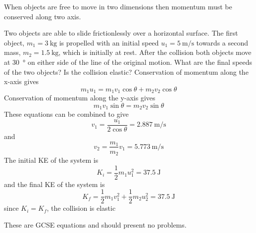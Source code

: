 \documentclass[main.tex]{subfiles}
\begin{document}

When objects are free to move in two dimensions then momentum must be conserved along two axis.

\begin{example}
	Two objects are able to slide frictionlessly over a horizontal surface. The first object, $m_1=\SI{3}{\kg}$ is propelled with an initial speed $u_1=\SI{5}{\m\per\s}$ towards a second mass, $m_2=\SI{1.5}{\kg}$, which is initially at rest. After the collision both objects move at \SI{30}{\degree} on either side of the line of the original motion. What are the final speeds of the two objects? Is the collision elastic?
	\answer
	Conservation of momentum along the x-axis gives
	$$ m_1u_1 = m_1v_1\cos{\theta} + m_2v_2\cos{\theta}$$
	Conservation of momentum along the y-axis gives
	$$ m_1v_1\sin{\theta} = m_2v_2\sin{\theta} $$
	These equations can be combined to give
	$$ v_1 = \frac{u_1}{2\cos{\theta}} = \SI{2.887}{\m\per\s}$$
	and
	$$ v_2 = \frac{m_1}{m_2}v_1= \SI{5.773}{\m\per\s}$$
	The initial KE of the system is
	$$ K_i = \frac{1}{2}m_1u_1^2 = \SI{37.5}{\joule} $$
	and the final KE of the system is
	$$ K_f = \frac{1}{2}m_1v_1^2 + \frac{1}{2}m_2u_2^2 = \SI{37.5}{\joule}$$
	since $K_i = K_f$, the collision is elastic
\end{example}

These are GCSE equations and should present no problems.
\end{document}
